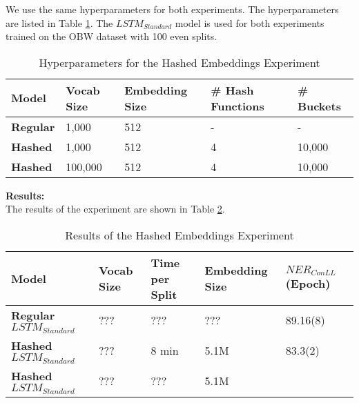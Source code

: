 \documentclass[11pt]{article}
\begin{document}
We use the same hyperparameters for both experiments. The hyperparameters are listed in
Table \ref{tab:hashed-embeddings-hyperparameters}. The $LSTM_{Standard}$ model is used for both experiments 
trained on the OBW dataset with 100 even splits.\\

\begin{table}[h]
\centering
\begin{tabular}{|l|l|l|l|l|}
\hline
\textbf{Model} & \textbf{Vocab Size} & \textbf{Embedding Size} & \textbf{\# Hash Functions} & \textbf{\# Buckets} \\ \hline
\textbf{Regular} & 1,000 & 512 & - & -      \\ \hline
\textbf{Hashed}  & 1,000  & 512 & 4 & 10,000 \\ \hline
\textbf{Hashed}  & 100,000 & 512 & 4 & 10,000 \\ \hline
\end{tabular}
\caption{Hyperparameters for the Hashed Embeddings Experiment}
\label{tab:hashed-embeddings-hyperparameters}
\end{table}


\textbf{Results:}\\
The results of the experiment are shown in Table \ref{tab:hashed-embeddings-results}. 

\begin{table}[h]
\centering
\begin{tabular}{|l|l|l|l|l|}
\hline
\textbf{Model} & \textbf{Vocab Size} & \textbf{Time per Split} & \textbf{Embedding Size} & \textbf{$NER_{ConLL}$}(Epoch) \\ \hline
\textbf{Regular $LSTM_{Standard}$} & ??? & ???   & ???    & 89.16(8) \\ \hline
\textbf{Hashed $LSTM_{Standard}$}  & ??? & 8 min & 5.1M   & 83.3(2)\\ \hline
\textbf{Hashed $LSTM_{Standard}$}  & ??? & ???   & 5.1M   & \\ \hline
\end{tabular}
\caption{Results of the Hashed Embeddings Experiment}
\label{tab:hashed-embeddings-results}
\end{table}




\end{document}
